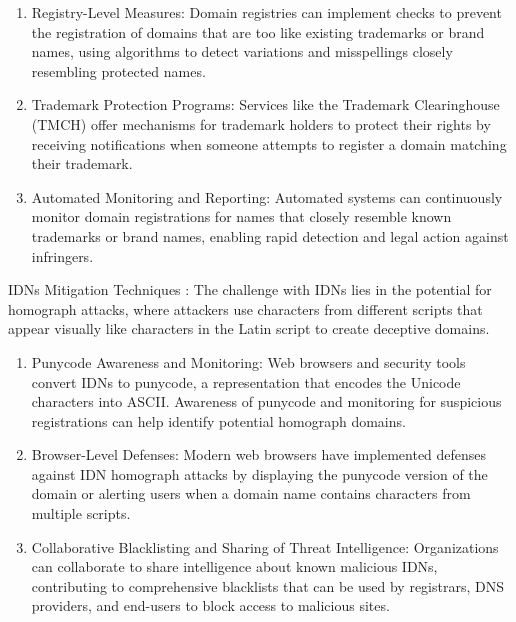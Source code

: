 \begin{enumerate}
  \item Registry-Level Measures: Domain registries can implement checks to prevent the registration of domains that are too like existing trademarks or brand names, using algorithms to detect variations and misspellings closely resembling protected names. \cite{WTR2020} 
  \item Trademark Protection Programs: Services like the Trademark Clearinghouse (TMCH) offer mechanisms for trademark holders to protect their rights by receiving notifications when someone attempts to register a domain matching their trademark. \cite{ICANNTMCH}
  \item Automated Monitoring and Reporting: Automated systems can continuously monitor domain registrations for names that closely resemble known trademarks or brand names, enabling rapid detection and legal action against infringers. \cite{TMCH2023}
\end{enumerate}

IDNs Mitigation Techniques : The challenge with IDNs lies in the potential for homograph attacks, where attackers use characters from different scripts that appear visually like characters in the Latin script to create deceptive domains.

\begin{enumerate}
  \item Punycode Awareness and Monitoring: Web browsers and security tools convert IDNs to punycode, a representation that encodes the Unicode characters into ASCII. Awareness of punycode and monitoring for suspicious registrations can help identify potential homograph domains. \cite{SOCRadar2023}
  \item Browser-Level Defenses: Modern web browsers have implemented defenses against IDN homograph attacks by displaying the punycode version of the domain or alerting users when a domain name contains characters from multiple scripts. \cite{Malwarebytes2017}
  \item Collaborative Blacklisting and Sharing of Threat Intelligence: Organizations can collaborate to share intelligence about known malicious IDNs, contributing to comprehensive blacklists that can be used by registrars, DNS providers, and end-users to block access to malicious sites. \cite{CyberThreatAlliance2023}
  
\end{enumerate}

